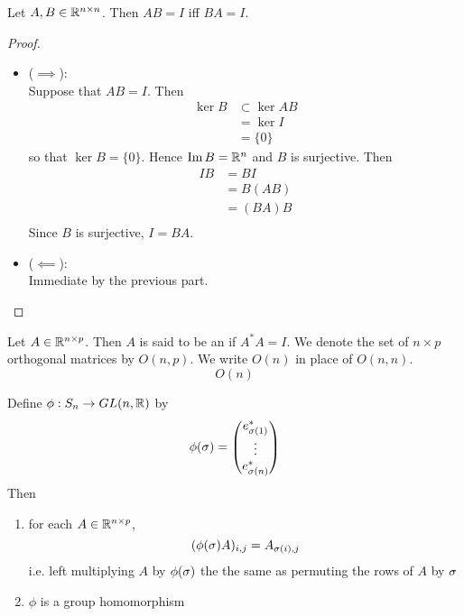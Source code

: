 \documentclass{book}
\begin{document}
	\begin{ex} 
		Let $A,B \in \mathbb{R}^{n \times n}$. Then $AB = I$ iff $BA = I$.
	\end{ex}

	\begin{proof}\
		\begin{itemize}
			\item ($\implies$): \\
			Suppose that $AB = I$. Then  
			\begin{align*}
				\ker B 
				& \subset \ker AB \\
				& = \ker I \\
				& = \{0\}
			\end{align*}
			so that $\ker B = \{0\}$. Hence $\text{Im} \, B = \mathbb{R}^n$ and $B$ is surjective. Then 
			\begin{align*}
				I B
				& = BI \\
				& = B(AB) \\
				& = (BA) B \\
			\end{align*}
			Since $B$ is surjective, $I = BA$. 
			\item ($\impliedby$): \\
			Immediate by the previous part.
		\end{itemize}
	\end{proof}

	\begin{defn} 
		Let $A \in \mathbb{R}^{n \times p}$. Then $A$ is said to be an  if $A^*A = I$. We denote the set of $n \times p$ orthogonal matrices by $O(n, p)$. We write $O(n)$ in place of $O(n, n)$.
		$$O(n)$$
	\end{defn}

	\begin{ex}  
		Define $\phi: S_n \rightarrow GL(n, \mathbb{R})$ by 
		$$\phi(\sigma) = 
		\begin{pmatrix}
			e_{\sigma(1)}^* \\
			\vdots \\
			e_{\sigma(n)}^*
		\end{pmatrix}
		$$
		Then 
		\begin{enumerate}
			\item for each $A \in \mathbb{R}^{n \times p}$, 
			$$ (\phi(\sigma) A)_{i,j}	= A_{\sigma(i), j} $$
			i.e. left multiplying $A$ by $\phi(\sigma)$ the the same as permuting the rows of $A$ by $\sigma$
			\item $\phi$ is a group homomorphism
		\end{enumerate}
	\end{ex}
\end{document}
